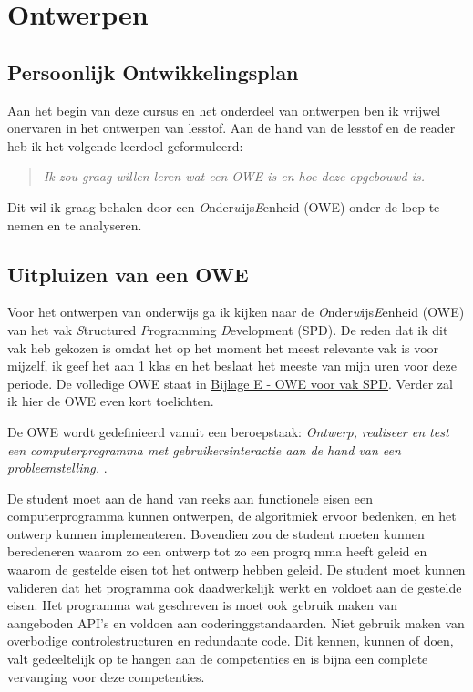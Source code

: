 \section{Ontwerpen}

\subsection{Persoonlijk Ontwikkelingsplan}
Aan het begin van deze cursus en het onderdeel van ontwerpen ben ik vrijwel onervaren in het ontwerpen van lesstof. Aan de hand van de lesstof en de reader heb ik het volgende leerdoel geformuleerd:
\begin{quote}
  \textit{Ik zou graag willen leren wat een OWE is en hoe deze opgebouwd is.}
\end{quote}
Dit wil ik graag behalen door een \textit{O}nder\textit{w}ijs\textit{E}enheid (OWE) onder de loep te nemen en te analyseren.

\subsection{Uitpluizen van een OWE}
Voor het ontwerpen van onderwijs ga ik kijken naar de \textit{O}nder\textit{w}ijs\textit{E}enheid (OWE) van het vak \textit{S}tructured \textit{P}rogramming \textit{D}evelopment (SPD). De reden dat ik dit vak heb gekozen is omdat het op het moment het meest relevante vak is voor mijzelf, ik geef het aan 1 klas en het beslaat het meeste van mijn uren voor deze periode. De volledige OWE staat in \hyperref[sec:owespd]{Bijlage E - OWE voor vak SPD}. Verder zal ik hier de OWE even kort toelichten.

De OWE wordt gedefinieerd vanuit een beroepstaak: \textit{Ontwerp, realiseer en test een computerprogramma met gebruikersinteractie aan de hand van een probleemstelling.
}.

De student moet aan de hand van reeks aan functionele eisen een computerprogramma kunnen ontwerpen, de algoritmiek ervoor bedenken, en het ontwerp kunnen implementeren. Bovendien zou de student moeten kunnen beredeneren waarom zo een ontwerp tot zo een progrq
mma heeft geleid en waarom de gestelde eisen tot het ontwerp hebben geleid. De student moet kunnen valideren dat het programma ook daadwerkelijk werkt en voldoet aan de gestelde eisen. Het programma wat geschreven is moet ook gebruik maken van aangeboden API's  en voldoen aan coderinggstandaarden. Niet gebruik maken van overbodige controlestructuren en redundante code. 
Dit kennen, kunnen of doen, valt gedeeltelijk op te hangen aan de competenties en is bijna een complete vervanging voor deze competenties. 

